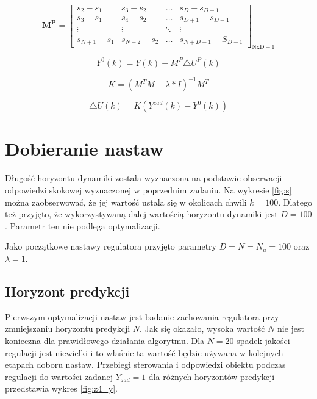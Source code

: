 \begin{equation}
\boldsymbol{M^P}=\left[
\begin{array}
{cccc}
s_{2}-s_{1} & s_{3}-s_{2} & \ldots & s_{D}-s_{D-1}\\
s_{3}-s_{1} & s_{4}-s_{2} & \ldots & s_{D+1}-s_{D-1}\\
\vdots & \vdots & \ddots & \vdots\\
s_{N+1}-s_{1} & s_{N+2}-s_{2} & \ldots &  s_{N+D-1}-S_{D-1}
\end{array}
\right]_{\mathrm{NxD-1}}
\label{MPm}
\end{equation}

\begin{equation}
Y^0(k)=Y(k)+M^P
\triangle U^P(k)
\label{Y0}
\end{equation}

\begin{equation}
K=(M^TM+\lambda*I)^{-1}M^T
\label{K}
\end{equation}

\begin{equation}
\triangle U(k)=K(Y^{zad}(k)-Y^0(k))
\label{dU1}
\end{equation}

\section{Dobieranie nastaw}
Długość horyzontu dynamiki została wyznaczona na podstawie obserwacji odpowiedzi skokowej wyznaczonej w poprzednim zadaniu. Na wykresie \ref{fig:s} można zaobserwować, że jej wartość ustala się w okolicach chwili $k=100$. Dlatego też przyjęto, że wykorzystywaną dalej wartością horyzontu dynamiki jest $D=100$. Parametr ten nie podlega optymalizacji.

Jako początkowe nastawy regulatora przyjęto parametry $D=N=N_u=100$ oraz $\lambda=1$.

\subsection{Horyzont predykcji}
 Pierwszym optymalizacji nastaw jest badanie zachowania regulatora przy zmniejszaniu horyzontu predykcji $N$. Jak się okazało, wysoka wartość $N$ nie jest konieczna dla prawidłowego działania algorytmu. Dla $N=20$ spadek jakości regulacji jest niewielki i to właśnie ta wartość będzie używana w kolejnych etapach doboru nastaw. Przebiegi sterowania i odpowiedzi obiektu podczas regulacji do wartości zadanej $Y_{zad}=1$ dla różnych horyzontów predykcji przedstawia wykres \ref{fig:z4_y}.


